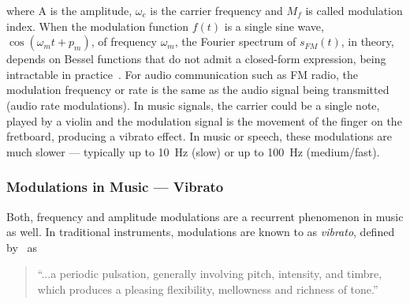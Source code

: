 where A is the amplitude, $\omega_{c}$ is the carrier frequency and $M_f$ is called modulation index.
When the modulation function $f(t)$ is a single sine wave, $\cos \left(\omega_{m} t+p_{m}\right)$, of frequency $\omega_{m}$, the Fourier spectrum of $s_{FM}(t)$, in theory, depends on Bessel functions that do not admit a closed-form expression, being intractable in practice~\cite{abramowitz64}.
For audio communication such as FM radio, the modulation frequency or rate is the same as the audio signal being transmitted (audio rate modulations).
In music signals, the carrier could be a single note, played by a violin and the modulation signal is the movement of the finger on the fretboard, producing a vibrato effect.
In music or speech, these modulations are much slower --- typically up to 10~\si{\hertz} (slow) or up to 100~\si{\hertz} (medium/fast).

\subsubsection*{Modulations in Music --- Vibrato}

Both, frequency and amplitude modulations are a recurrent phenomenon in music as well.
In traditional instruments, modulations are known to as \emph{vibrato}, defined by~\cite{seashore31} as

\begin{quote}
``...a periodic pulsation, generally involving pitch, intensity, and timbre, which produces a pleasing flexibility, mellowness and richness of tone.''
\end{quote}

